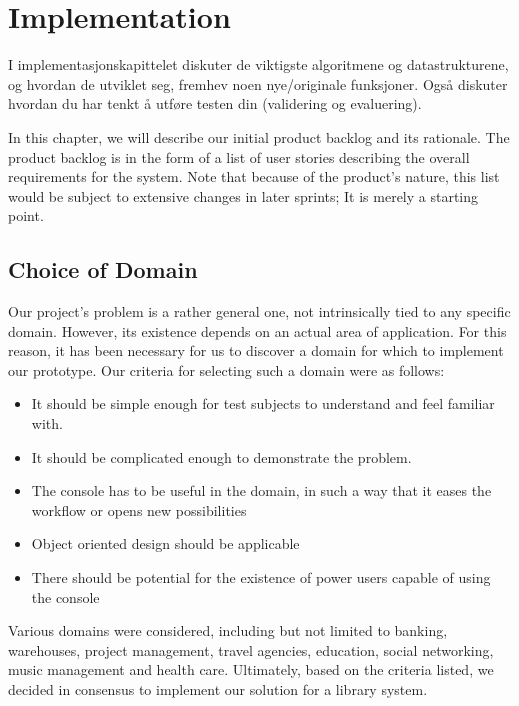 \chapter{Implementation}

\minitoc

I implementasjonskapittelet diskuter de viktigste algoritmene
og datastrukturene, og hvordan de utviklet seg, fremhev noen
nye/originale funksjoner. Også diskuter hvordan du har
tenkt å utføre testen din (validering og evaluering).

In this chapter, we will describe our initial product backlog and its rationale. The product backlog is in the form of a list of user stories describing the overall requirements for the system. Note that because of the product's nature, this list would be subject to extensive changes in later sprints; It is merely a starting point.

\clearpage

\section{Choice of Domain}
Our project's problem is a rather general one, not intrinsically tied to any specific domain. However, its existence depends on an actual area of application. For this reason, it has been necessary for us to discover a domain for which to implement our prototype. Our criteria for selecting such a domain were as follows:
\begin{itemize}
\item It should be simple enough for test subjects to understand and feel familiar with.
\item It should be complicated enough to demonstrate the problem.
\item The console has to be useful in the domain, in such a way that it eases the workflow or opens new possibilities
\item Object oriented design should be applicable
\item There should be potential for the existence of power users capable of using the console
\end{itemize}
Various domains were considered, including but not limited to banking, warehouses, project management, travel agencies, education, social networking, music management and health care. Ultimately, based on the criteria listed, we decided in consensus to implement our solution for a library system.

